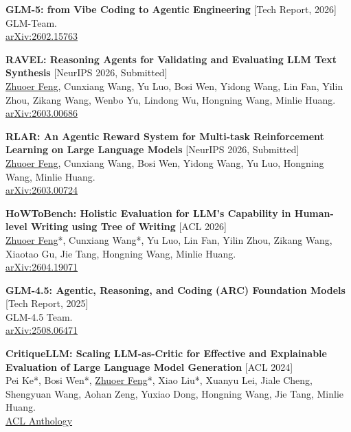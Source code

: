 \documentclass[11pt, a4paper]{article}
\begin{document}
\begin{enumerate}[leftmargin=1.5em, topsep=2pt, itemsep=6pt, parsep=0pt, label={[\arabic*]}]

    \item \textbf{GLM-5: from Vibe Coding to Agentic Engineering} \textcolor{accent}{[Tech Report, 2026]} \\
    {\small GLM-Team.} \\
    {\small \href{https://arxiv.org/abs/2602.15763}{arXiv:2602.15763}}

    \item \textbf{RAVEL: Reasoning Agents for Validating and Evaluating LLM Text Synthesis} \textcolor{accent}{[NeurIPS 2026, Submitted]} \\
    {\small \underline{Zhuoer Feng}, Cunxiang Wang, Yu Luo, Bosi Wen, Yidong Wang, Lin Fan, Yilin Zhou, Zikang Wang, Wenbo Yu, Lindong Wu, Hongning Wang, Minlie Huang.} \\
    {\small \href{https://arxiv.org/abs/2603.00686}{arXiv:2603.00686}}

    \item \textbf{RLAR: An Agentic Reward System for Multi-task Reinforcement Learning on Large Language Models} \textcolor{accent}{[NeurIPS 2026, Submitted]} \\
    {\small \underline{Zhuoer Feng}, Cunxiang Wang, Bosi Wen, Yidong Wang, Yu Luo, Hongning Wang, Minlie Huang.} \\
    {\small \href{https://arxiv.org/abs/2603.00724}{arXiv:2603.00724}}

    \item \textbf{HoWToBench: Holistic Evaluation for LLM's Capability in Human-level Writing using Tree of Writing} \textcolor{accent}{[ACL 2026]} \\
    {\small \underline{Zhuoer Feng}*, Cunxiang Wang*, Yu Luo, Lin Fan, Yilin Zhou, Zikang Wang, Xiaotao Gu, Jie Tang, Hongning Wang, Minlie Huang.} \\
    {\small \href{https://arxiv.org/abs/2604.19071}{arXiv:2604.19071}}

    \item \textbf{GLM-4.5: Agentic, Reasoning, and Coding (ARC) Foundation Models} \textcolor{accent}{[Tech Report, 2025]} \\
    {\small GLM-4.5 Team.} \\
    {\small \href{https://arxiv.org/abs/2508.06471}{arXiv:2508.06471}}

    \item \textbf{CritiqueLLM: Scaling LLM-as-Critic for Effective and Explainable Evaluation of Large Language Model Generation} \textcolor{accent}{[ACL 2024]} \\
    {\small Pei Ke*, Bosi Wen*, \underline{Zhuoer Feng}*, Xiao Liu*, Xuanyu Lei, Jiale Cheng, Shengyuan Wang, Aohan Zeng, Yuxiao Dong, Hongning Wang, Jie Tang, Minlie Huang.} \\
    {\small \href{https://aclanthology.org/2024.acl-long.704/}{ACL Anthology}}


\end{enumerate}
\end{document}
